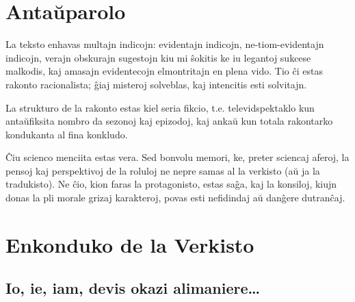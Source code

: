 \chapter*{Antaŭparolo}

La teksto enhavas multajn indicojn: evidentajn indicojn, ne-tiom-evidentajn indicojn, verajn obskurajn sugestojn kiu mi ŝokitis ke iu legantoj sukcese malkodis, kaj amasajn evidentecojn elmontritajn en plena vido.
Tio ĉi estas rakonto racionalista; ĝiaj misteroj solveblas, kaj intencitis esti solvitajn.

La strukturo de la rakonto estas kiel seria fikcio, t.e. televidspektaklo kun antaŭfiksita nombro da sezonoj kaj epizodoj, kaj ankaŭ kun totala rakontarko kondukanta al fina konkludo.


Ĉiu scienco menciita estas vera.
Sed bonvolu memori, ke, preter sciencaj aferoj, la pensoj kaj perspektivoj de la roluloj ne nepre samas al la verkisto (aŭ ja la tradukisto).
Ne ĉio, kion faras la protagonisto, estas saĝa, kaj la konsiloj, kiujn donas la pli morale grizaj karakteroj, povas esti nefidindaj aŭ danĝere dutranĉaj.

\chapter*{Enkonduko de la Verkisto}

\section*{Io, ie, iam, devis okazi alimaniere…}

